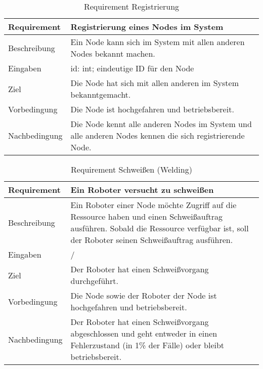 \begin{table}[h!]
\begin{center}
\begin{tabular}{ |p{2.5cm}|p{11cm}| } 
 \hline
 Requirement & Registrierung eines Nodes im System \\
 \hline
 Beschreibung & Ein Node kann sich im System mit allen anderen Nodes bekannt machen. \\
 \hline
 Eingaben & id: int; eindeutige ID für den Node \\
 \hline
 Ziel & Die Node hat sich mit allen anderen im System bekanntgemacht. \\
 \hline
 Vorbedingung & Die Node ist hochgefahren und betriebsbereit. \\
 \hline
 Nachbedingung & Die Node kennt alle anderen Nodes im System und alle anderen Nodes kennen die sich 
 registrierende Node. \\
 \hline
\end{tabular}
\caption{Requirement Registrierung}
\label{table:1}
\end{center}
\end{table}

\begin{table}[h!]
\begin{center}
\begin{tabular}{ |p{2.5cm}|p{11cm}| } 
 \hline
 Requirement & Ein Roboter versucht zu schweißen \\
 \hline
 Beschreibung & Ein Roboter einer Node möchte Zugriff auf die Ressource haben und einen Schweißauftrag
 ausführen. Sobald die Ressource verfügbar ist, soll der Roboter seinen Schweißauftrag ausführen.\\
 \hline
 Eingaben & / \\
 \hline
 Ziel & Der Roboter hat einen Schweißvorgang durchgeführt. \\
 \hline
 Vorbedingung & Die Node sowie der Roboter der Node ist hochgefahren und betriebsbereit. \\
 \hline
 Nachbedingung & Der Roboter hat einen Schweißvorgang abgeschlossen und geht entweder in einen Fehlerzustand
 (in 1\% der Fälle) oder bleibt betriebsbereit. \\
 \hline
\end{tabular}
\caption{Requirement Schweißen (Welding)}
\label{table:2}
\end{center}
\end{table}


